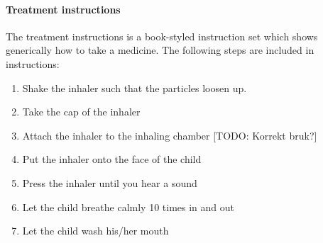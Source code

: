 \paragraph{Treatment instructions}
The treatment instructions is a book-styled instruction set which shows generically how to take a medicine. 
The following steps are included in instructions: 
\begin{enumerate}
  \item Shake the inhaler such that the particles loosen up. 
  \item Take the cap of the inhaler
  \item Attach the inhaler to the inhaling chamber [TODO: Korrekt bruk?]
  \item Put the inhaler onto the face of the child
  \item Press the inhaler until you hear a sound
  \item Let the child breathe calmly 10 times in and out
  \item Let the child wash his/her mouth
\end{enumerate} 




